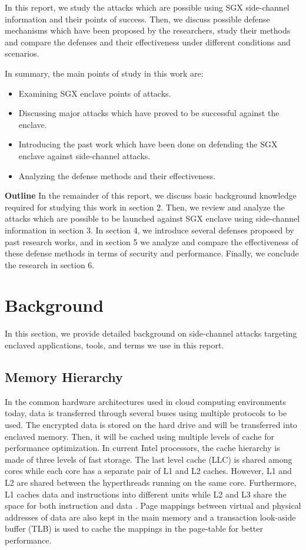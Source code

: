 In this report, we study the attacks which are possible using SGX side-channel information and their points of success. Then, we discuss possible defense mechanisms which have been proposed by the researchers, study their methods and compare the defenses and their effectiveness under different conditions and scenarios.

In summary, the main points of study in this work are:
\begin{itemize}
	\item Examining SGX enclave points of attacks.
	\item Discussing major attacks which have proved to be successful against the enclave.
	\item Introducing the past work which have been done on defending the SGX enclave against side-channel attacks.
	\item Analyzing the defense methods and their effectiveness.
\end{itemize} 
\textbf{Outline} In the remainder of this report, we discuss basic background knowledge required for studying this work in section 2. Then, we review and analyze the attacks which are possible to be launched against SGX enclave using side-channel information in section 3. In section 4, we introduce several defenses proposed by past research works, and in section 5 we analyze and compare the effectiveness of these defense methods in terms of security and performance. Finally, we conclude the research in section 6.
\section{Background}
In this section, we provide detailed background on side-channel attacks targeting enclaved applications, tools, and terms we use in this report.

\subsection{Memory Hierarchy}

In the common hardware architectures used in cloud computing environments today, data is transferred through several buses using multiple protocols to be used. The encrypted data is stored on the hard drive and will be transferred into enclaved memory. Then, it will be cached using multiple levels of cache for performance optimization. In current Intel processors, the cache hierarchy is made of three levels of fast storage. The last level cache (LLC) is shared among cores while each core has a separate pair of L1 and L2 caches. However, L1 and L2 are shared between the hyperthreads running on the same core. Furthermore, L1 caches data and instructions into different units while L2 and L3 share the space for both instruction and data \cite{brasser2017software}. Page mappings between virtual and physical addresses of data are also kept in the main memory and a transaction look-aside buffer (TLB) is used to cache the mappings in the page-table for better performance.

